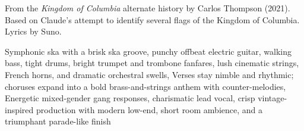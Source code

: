 
\begin{notes}
From the \emph{Kingdom of Columbia} alternate history by Carlos Thompson (2021). Based on Claude's attempt to identify several flags of the Kingdom of Columbia. Lyrics by Suno.
\end{notes}
\begin{style}
Symphonic ska with a brisk  ska groove, punchy offbeat electric guitar, walking bass, tight drums, bright trumpet and trombone fanfares, lush cinematic strings, French horns, and dramatic orchestral swells, Verses stay nimble and rhythmic; choruses expand into a bold brass-and-strings anthem with counter-melodies, Energetic mixed-gender gang responses, charismatic lead vocal, crisp vintage-inspired production with modern low-end, short room ambience, and a triumphant parade-like finish
\end{style}
